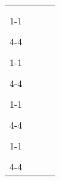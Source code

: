 \documentclass[11pt]{article} %
\begin{document}
\begin{tabularx}{\linewidth}{p{4cm}c|cX}
    &&&\\ &&&\\\cline{1-1}\cline{4-4}
    &&&\\ &&&\\\cline{4-4}
    &&&\\ &&&\\\cline{1-1}\cline{4-4}
    &&&\\ &&&\\\cline{4-4}
    &&&\\ &&&\\\cline{1-1}\cline{4-4}
    &&&\\ &&&\\\cline{4-4}
    &&&\\ &&&\\\cline{1-1}\cline{4-4}
    &&&\\ &&&\\\cline{4-4}

\end{tabularx}
\end{document}
